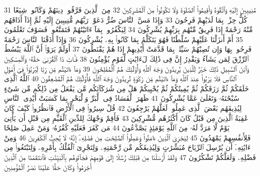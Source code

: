 {\tiny\colorbox{cl_aya}{31}} مُنِيبِينَ إِلَيْهِ وَٱتَّقُوهُ وَأَقِيمُوا۟ ٱلصَّلَوٰةَ وَلَا تَكُونُوا۟ مِنَ ٱلْمُشْرِكِينَ
{\tiny\colorbox{cl_aya}{32}} مِنَ ٱلَّذِينَ فَرَّقُوا۟ دِينَهُمْ وَكَانُوا۟ شِيَعًا كُلُّ حِزْبٍۭ بِمَا لَدَيْهِمْ فَرِحُونَ
{\tiny\colorbox{cl_aya}{33}} وَإِذَا مَسَّ ٱلنَّاسَ ضُرٌّ دَعَوْا۟ رَبَّهُم مُّنِيبِينَ إِلَيْهِ ثُمَّ إِذَآ أَذَاقَهُم مِّنْهُ رَحْمَةً إِذَا فَرِيقٌ مِّنْهُم بِرَبِّهِمْ يُشْرِكُونَ
{\tiny\colorbox{cl_aya}{34}} لِيَكْفُرُوا۟ بِمَآ ءَاتَيْنَٰهُمْ فَتَمَتَّعُوا۟ فَسَوْفَ تَعْلَمُونَ
{\tiny\colorbox{cl_aya}{35}} أَمْ أَنزَلْنَا عَلَيْهِمْ سُلْطَٰنًا فَهُوَ يَتَكَلَّمُ بِمَا كَانُوا۟ بِهِۦ يُشْرِكُونَ
{\tiny\colorbox{cl_aya}{36}} وَإِذَآ أَذَقْنَا ٱلنَّاسَ رَحْمَةً فَرِحُوا۟ بِهَا وَإِن تُصِبْهُمْ سَيِّئَةٌۢ بِمَا قَدَّمَتْ أَيْدِيهِمْ إِذَا هُمْ يَقْنَطُونَ
{\tiny\colorbox{cl_aya}{37}} أَوَلَمْ يَرَوْا۟ أَنَّ ٱللَّهَ يَبْسُطُ ٱلرِّزْقَ لِمَن يَشَآءُ وَيَقْدِرُ إِنَّ فِى ذَٰلِكَ لَءَايَٰتٍ لِّقَوْمٍ يُؤْمِنُونَ
{\tiny\colorbox{cl_aya}{38}} فَـَٔاتِ ذَا ٱلْقُرْبَىٰ حَقَّهُۥ وَٱلْمِسْكِينَ وَٱبْنَ ٱلسَّبِيلِ ذَٰلِكَ خَيْرٌ لِّلَّذِينَ يُرِيدُونَ وَجْهَ ٱللَّهِ وَأُو۟لَٰٓئِكَ هُمُ ٱلْمُفْلِحُونَ
{\tiny\colorbox{cl_aya}{39}} وَمَآ ءَاتَيْتُم مِّن رِّبًا لِّيَرْبُوَا۟ فِىٓ أَمْوَٰلِ ٱلنَّاسِ فَلَا يَرْبُوا۟ عِندَ ٱللَّهِ وَمَآ ءَاتَيْتُم مِّن زَكَوٰةٍ تُرِيدُونَ وَجْهَ ٱللَّهِ فَأُو۟لَٰٓئِكَ هُمُ ٱلْمُضْعِفُونَ
{\tiny\colorbox{cl_aya}{40}} ٱللَّهُ ٱلَّذِى خَلَقَكُمْ ثُمَّ رَزَقَكُمْ ثُمَّ يُمِيتُكُمْ ثُمَّ يُحْيِيكُمْ هَلْ مِن شُرَكَآئِكُم مَّن يَفْعَلُ مِن ذَٰلِكُم مِّن شَىْءٍ سُبْحَٰنَهُۥ وَتَعَٰلَىٰ عَمَّا يُشْرِكُونَ
{\tiny\colorbox{cl_aya}{41}} ظَهَرَ ٱلْفَسَادُ فِى ٱلْبَرِّ وَٱلْبَحْرِ بِمَا كَسَبَتْ أَيْدِى ٱلنَّاسِ لِيُذِيقَهُم بَعْضَ ٱلَّذِى عَمِلُوا۟ لَعَلَّهُمْ يَرْجِعُونَ
{\tiny\colorbox{cl_aya}{42}} قُلْ سِيرُوا۟ فِى ٱلْأَرْضِ فَٱنظُرُوا۟ كَيْفَ كَانَ عَٰقِبَةُ ٱلَّذِينَ مِن قَبْلُ كَانَ أَكْثَرُهُم مُّشْرِكِينَ
{\tiny\colorbox{cl_aya}{43}} فَأَقِمْ وَجْهَكَ لِلدِّينِ ٱلْقَيِّمِ مِن قَبْلِ أَن يَأْتِىَ يَوْمٌ لَّا مَرَدَّ لَهُۥ مِنَ ٱللَّهِ يَوْمَئِذٍ يَصَّدَّعُونَ
{\tiny\colorbox{cl_aya}{44}} مَن كَفَرَ فَعَلَيْهِ كُفْرُهُۥ وَمَنْ عَمِلَ صَٰلِحًا فَلِأَنفُسِهِمْ يَمْهَدُونَ
{\tiny\colorbox{cl_aya}{45}} لِيَجْزِىَ ٱلَّذِينَ ءَامَنُوا۟ وَعَمِلُوا۟ ٱلصَّٰلِحَٰتِ مِن فَضْلِهِۦٓ إِنَّهُۥ لَا يُحِبُّ ٱلْكَٰفِرِينَ
{\tiny\colorbox{cl_aya}{46}} وَمِنْ ءَايَٰتِهِۦٓ أَن يُرْسِلَ ٱلرِّيَاحَ مُبَشِّرَٰتٍ وَلِيُذِيقَكُم مِّن رَّحْمَتِهِۦ وَلِتَجْرِىَ ٱلْفُلْكُ بِأَمْرِهِۦ وَلِتَبْتَغُوا۟ مِن فَضْلِهِۦ وَلَعَلَّكُمْ تَشْكُرُونَ
{\tiny\colorbox{cl_aya}{47}} وَلَقَدْ أَرْسَلْنَا مِن قَبْلِكَ رُسُلًا إِلَىٰ قَوْمِهِمْ فَجَآءُوهُم بِٱلْبَيِّنَٰتِ فَٱنتَقَمْنَا مِنَ ٱلَّذِينَ أَجْرَمُوا۟ وَكَانَ حَقًّا عَلَيْنَا نَصْرُ ٱلْمُؤْمِنِينَ

